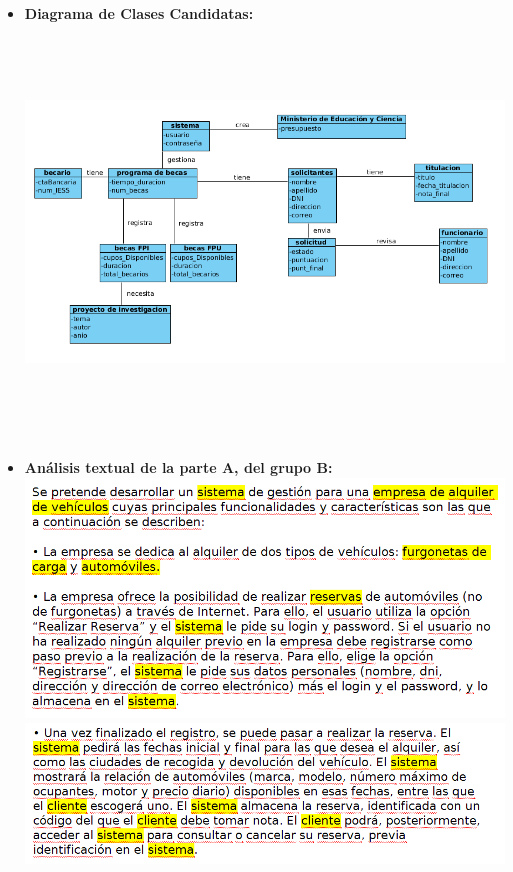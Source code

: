 \documentclass{article}
\begin{document}
{\begin{flushleft}
\begin{itemize}
\item\textbf {Diagrama de Clases Candidatas: }\\
\includegraphics[width=16cm, height=11cm]{img/parteAmodelo} \hspace{0.5cm}
\newpage
\item\textbf {Análisis textual de la parte A, del grupo B: }\\
\includegraphics[width=16cm]{img/parteB1} \hspace{0.5cm}
\includegraphics[width=16cm]{img/parteB2} \hspace{0.5cm}

\end{itemize}
\end{flushleft}}
\end{document}
